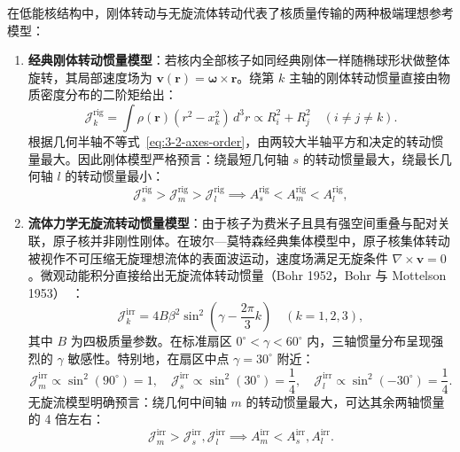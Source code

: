 在低能核结构中，刚体转动与无旋流体转动代表了核质量传输的两种极端理想参考模型：
\begin{enumerate}
\item \textbf{经典刚体转动惯量模型}：若核内全部核子如同经典刚体一样随椭球形状做整体旋转，其局部速度场为 $\mathbf{v}(\mathbf{r}) = \boldsymbol{\omega} \times \mathbf{r}$。绕第 $k$ 主轴的刚体转动惯量直接由物质密度分布的二阶矩给出：
\begin{equation}\label{eq:3-2-rigid-inertia}
\mathcal{J}_k^{\text{rig}} = \int \rho(\mathbf{r}) (r^2 - x_k^2) \, d^3r \propto R_i^2 + R_j^2 \quad (i \ne j \ne k).
\end{equation}
根据几何半轴不等式~\eqref{eq:3-2-axes-order}，由两较大半轴平方和决定的转动惯量最大。因此刚体模型严格预言：绕最短几何轴 $s$ 的转动惯量最大，绕最长几何轴 $l$ 的转动惯量最小：
\begin{equation}\label{eq:3-2-rigid-order}
\mathcal{J}_s^{\text{rig}} > \mathcal{J}_m^{\text{rig}} > \mathcal{J}_l^{\text{rig}} \implies A_s^{\text{rig}} < A_m^{\text{rig}} < A_l^{\text{rig}} ,
\end{equation}
\item \textbf{流体力学无旋流转动惯量模型}：由于核子为费米子且具有强空间重叠与配对关联，原子核并非刚性刚体。在玻尔—莫特森经典集体模型中，原子核集体转动被视作不可压缩无旋理想流体的表面波运动，速度场满足无旋条件 $\nabla \times \mathbf{v} = 0$。微观动能积分直接给出无旋流体转动惯量（Bohr 1952，Bohr 与 Mottelson 1953）~\cite{bohr-1952-surface-particle-coupling,bohr-mottelson-1953-collective-individual-original}：
\begin{equation}\label{eq:3-2-irrot-inertia}
\mathcal{J}_k^{\text{irr}} = 4 B \beta^2 \sin^2\left(\gamma - \frac{2\pi}{3} k\right) \quad (k = 1, 2, 3),
\end{equation}
其中 $B$ 为四极质量参数。在标准扇区 $0^\circ < \gamma < 60^\circ$ 内，三轴惯量分布呈现强烈的 $\gamma$ 敏感性。特别地，在扇区中点 $\gamma = 30^\circ$ 附近：
\begin{equation}\label{eq:3-2-irrot-order}
\mathcal{J}_m^{\text{irr}} \propto \sin^2(90^\circ) = 1, \quad \mathcal{J}_s^{\text{irr}} \propto \sin^2(30^\circ) = \frac{1}{4}, \quad \mathcal{J}_l^{\text{irr}} \propto \sin^2(-30^\circ) = \frac{1}{4}.
\end{equation}
无旋流模型明确预言：绕几何中间轴 $m$ 的转动惯量最大，可达其余两轴惯量的 4 倍左右：
\begin{equation}
\mathcal{J}_m^{\text{irr}} > \mathcal{J}_s^{\text{irr}}, \mathcal{J}_l^{\text{irr}} \implies A_m^{\text{irr}} < A_s^{\text{irr}}, A_l^{\text{irr}}.
\end{equation}
\end{enumerate}

